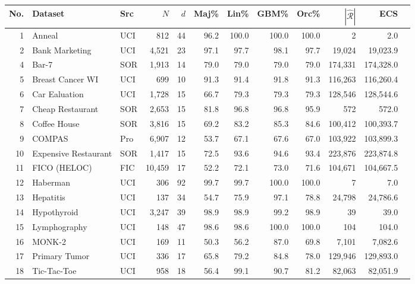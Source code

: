\begin{table}[htbp]
    \centering
    \scriptsize
    \begin{tabular}{rllrrrrrrrrr}
        \toprule
        \textbf{No.} & \textbf{Dataset} & \textbf{Src} & $N$ & $d$ & \textbf{Maj\%} & \textbf{Lin\%} & \textbf{GBM\%} & \textbf{Orc\%} & $|\hat{\mathcal{R}}|$ & \textbf{ECS} \\ 
        \midrule
        1 & Anneal & UCI & 812 & 44 & 96.2 & 100.0 & 100.0 & 100.0 & 2 & 2.0 \\
        2 & Bank Marketing & UCI & 4,521 & 23 & 97.1 & 97.7 & 98.1 & 97.7 & 19,024 & 19,023.9 \\
        4 & Bar-7 & SOR & 1,913 & 14 & 79.0 & 79.0 & 79.0 & 79.0 & 174,331 & 174,328.0 \\
        5 & Breast Cancer WI & UCI & 699 & 10 & 91.3 & 91.4 & 91.8 & 91.3 & 116,263 & 116,260.4 \\
        6 & Car Ealuation & UCI & 1,728 & 15 & 66.7 & 79.3 & 79.3 & 79.3 & 128,546 & 128,544.6 \\
        7 & Cheap Restaurant & SOR & 2,653 & 15 & 81.8 & 96.8 & 96.8 & 95.9 & 572 & 572.0 \\
        8 & Coffee House & SOR & 3,816 & 15 & 69.2 & 83.2 & 85.3 & 84.6 & 100,412 & 100,393.7 \\
        9 & COMPAS & Pro & 6,907 & 12 & 53.7 & 67.1 & 67.6 & 67.0 & 103,922 & 103,899.3 \\
        10 & Expensive Restaurant & SOR & 1,417 & 15 & 72.5 & 93.6 & 94.6 & 93.4 & 223,876 & 223,874.8 \\
        11 & FICO (HELOC) & FIC & 10,459 & 17 & 52.2 & 72.1 & 73.0 & 71.6 & 104,671 & 104,667.5 \\
        12 & Haberman & UCI & 306 & 92 & 99.7 & 99.7 & 100.0 & 100.0 & 7 & 7.0 \\
        13 & Hepatitis & UCI & 137 & 34 & 54.7 & 75.9 & 97.1 & 78.8 & 24,798 & 24,786.6 \\
        14 & Hypothyroid & UCI & 3,247 & 39 & 98.9 & 98.9 & 99.2 & 98.9 & 39 & 39.0 \\
        15 & Lymphography & UCI & 148 & 47 & 98.6 & 98.6 & 100.0 & 100.0 & 104 & 104.0 \\
        16 & MONK-2 & UCI & 169 & 11 & 50.3 & 56.2 & 87.0 & 69.8 & 7,101 & 7,082.6 \\
        17 & Primary Tumor & UCI & 336 & 17 & 65.8 & 79.2 & 84.8 & 78.0 & 129,946 & 129,893.0 \\
        18 & Tic-Tac-Toe & UCI & 958 & 18 & 56.4 & 99.1 & 90.7 & 81.2 & 82,063 & 82,051.9 \\

\end{tabular}
\end{table}

